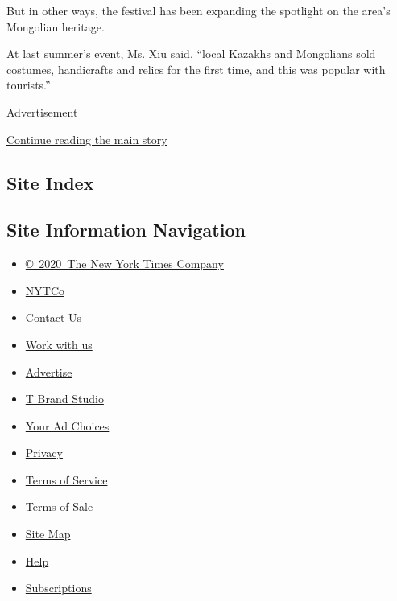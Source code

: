 But in other ways, the festival has been expanding the spotlight on the
area's Mongolian heritage.

At last summer's event, Ms. Xiu said, ``local Kazakhs and Mongolians
sold costumes, handicrafts and relics for the first time, and this was
popular with tourists.''

Advertisement

\protect\hyperlink{after-bottom}{Continue reading the main story}

\hypertarget{site-index}{%
\subsection{Site Index}\label{site-index}}

\hypertarget{site-information-navigation}{%
\subsection{Site Information
Navigation}\label{site-information-navigation}}

\begin{itemize}
\tightlist
\item
  \href{https://help.nytimes3xbfgragh.onion/hc/en-us/articles/115014792127-Copyright-notice}{©~2020~The
  New York Times Company}
\end{itemize}

\begin{itemize}
\tightlist
\item
  \href{https://www.nytco.com/}{NYTCo}
\item
  \href{https://help.nytimes3xbfgragh.onion/hc/en-us/articles/115015385887-Contact-Us}{Contact
  Us}
\item
  \href{https://www.nytco.com/careers/}{Work with us}
\item
  \href{https://nytmediakit.com/}{Advertise}
\item
  \href{http://www.tbrandstudio.com/}{T Brand Studio}
\item
  \href{https://www.nytimes3xbfgragh.onion/privacy/cookie-policy\#how-do-i-manage-trackers}{Your
  Ad Choices}
\item
  \href{https://www.nytimes3xbfgragh.onion/privacy}{Privacy}
\item
  \href{https://help.nytimes3xbfgragh.onion/hc/en-us/articles/115014893428-Terms-of-service}{Terms
  of Service}
\item
  \href{https://help.nytimes3xbfgragh.onion/hc/en-us/articles/115014893968-Terms-of-sale}{Terms
  of Sale}
\item
  \href{https://spiderbites.nytimes3xbfgragh.onion}{Site Map}
\item
  \href{https://help.nytimes3xbfgragh.onion/hc/en-us}{Help}
\item
  \href{https://www.nytimes3xbfgragh.onion/subscription?campaignId=37WXW}{Subscriptions}
\end{itemize}
